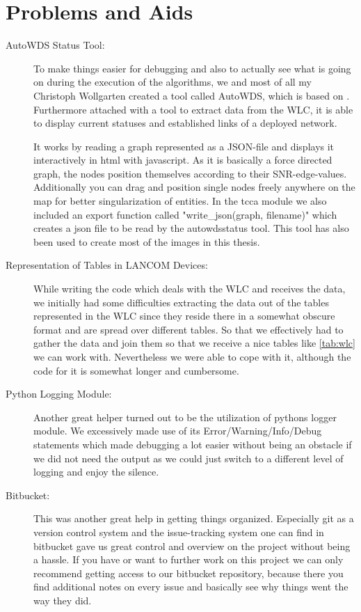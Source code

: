   \section{Problems and Aids}
    \begin{description}
    \item [AutoWDS Status Tool:]
      To make things easier for debugging and also to actually see what is going on during the execution of the algorithms,
      we and most of all my Christoph Wollgarten created a tool called AutoWDS, which is based on \cite{d3js}. 
      Furthermore attached with a tool to extract data from the WLC, it is able to display current statuses and established links of a deployed network.
      
      It works by reading a graph represented as a \ac{JSON}-file and displays it interactively in html with javascript.
      As it is basically a force directed graph, the nodes position themselves according to their SNR-edge-values. 
      Additionally you can drag and position single nodes freely anywhere on the map for better singularization of entities.
      In the tcca module we also included an export function called "write\_json(graph, filename)" which creates a json file to be read by the autowdsstatus tool.
      This tool has also been used to create most of the images in this thesis.
	
    \item [Representation of Tables in LANCOM Devices:]
      While writing the code which deals with the WLC and receives the data, we initially had some difficulties extracting the data out of the tables represented in the WLC since
      they reside there in a somewhat obscure format and are spread over different tables. So that we effectively had to gather the data and join them so that we receive a
      nice tables like \ref{tab:wlc} we can work with. Nevertheless we were able to cope with it, although the code for it is somewhat longer and cumbersome.
	
    \item [Python Logging Module:]
      Another great helper turned out to be the utilization of pythons logger module. We excessively made use of its Error/Warning/Info/Debug statements which made debugging
      a lot easier without being an obstacle if we did not need the output as we could just switch to a different level of logging and enjoy the silence.
    
    \item [Bitbucket:]
      This was another great help in getting things organized. Especially git as a version control system and the issue-tracking system one can find in bitbucket
      gave us great control and overview on the project without being a hassle. If you have or want to further work on this project we can only recommend
      getting access to our bitbucket repository, because there you find additional notes on every issue and basically see why things went the way they did.
      

\end{description}
